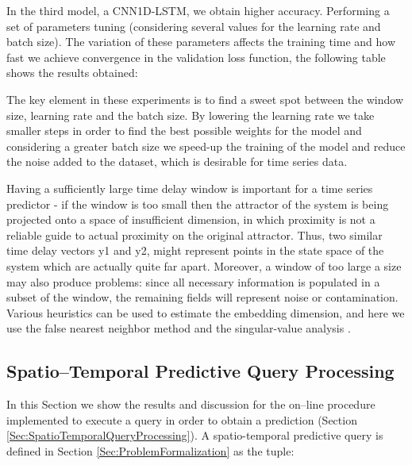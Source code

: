 In the third model, a CNN1D-LSTM, we obtain higher accuracy. Performing a set of parameters tuning (considering several values for the learning rate and batch size). The variation of these parameters affects the training time and how fast we achieve convergence in the validation loss function, the following table shows the results obtained:

The key element in these experiments is to find a sweet spot between the window size, learning rate and the batch size. By lowering the learning rate we take smaller steps in order to find the best possible weights for the model and considering a greater batch size we speed-up the training of the model and reduce the noise added to the dataset, which is desirable for time series data.

Having a sufficiently large time delay window is important for a time series predictor - if the window is too small then the attractor of the system is being projected onto a space of insufficient dimension, in which proximity is not a reliable guide to actual proximity on the original attractor. Thus, two similar time delay vectors y1 and y2, might represent points in the state space of the system which are actually quite far apart.  Moreover, a window of too large a size may also produce problems: since all necessary information is populated in a subset of the window, the remaining fields will represent noise or contamination.  Various heuristics can be used to estimate the embedding dimension, and here we use the false nearest neighbor method and the singular-value analysis \cite{Fawaz2019}.


\subsection{Spatio--Temporal Predictive Query Processing}

In this Section we show the results and discussion for the on--line procedure implemented to execute a query in order to obtain a prediction (Section \ref{Sec:SpatioTemporalQueryProcessing}). A spatio-temporal predictive query is defined in Section \ref{Sec:ProblemFormalization}  as the tuple:

